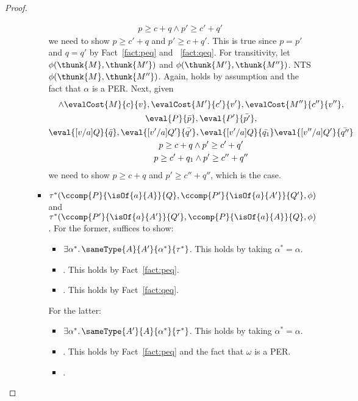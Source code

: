 \begin{proof}
\begin{enumerate}
\begin{itemize}
\begin{itemize}
\begin{gather*}
          p \ge c + q \land p' \ge c' + q'
        \end{gather*}
        we need to show 
        $p \ge c'  + q$ and $p' \ge c + q'$. This is true since $p = p'$ and $q = q'$ 
        by Fact~\ref{fact:peq} and ~\ref{fact:qeq}.
        For transitivity, let $\phi(\thunk{M}, \thunk{M'})$ and 
        $\phi(\thunk{M'}, \thunk{M''})$. NTS $\phi(\thunk{M}, \thunk{M''})$. Again,
         holds by assumption and the fact that $\alpha$ is 
        a PER. Next, given 
        \begin{gather*}
          \land \evalCost{M}{c}{v}, \evalCost{M'}{c'}{v'}, \evalCost{M''}{c''}{v''},\\
          \eval{P}{\bar{p}}, \eval{P'}{\bar{p'}},\\ 
          \eval{[v/a]Q}{\bar{q}}, \eval{[v'/a]Q'}{\bar{q'}}, 
            \eval{[v'/a]Q}{\bar{q_1}} \eval{[v''/a]Q'}{\bar{q''}}\\
          p \ge c + q \land p' \ge c' + q'\\
          p \ge c' + q_1 \land p' \ge c'' + q''
        \end{gather*}
        we need to show $p \ge c  + q$ and $p' \ge c'' + q''$, which is the case.
      \item $\tau^*(\ccomp{P}{\isOf{a}{A}}{Q}, \ccomp{P'}{\isOf{a}{A'}}{Q'}, \phi)$ and
        $\tau^*(\ccomp{P'}{\isOf{a}{A'}}{Q'}, \ccomp{P}{\isOf{a}{A}}{Q}, \phi)$.
        For the former, suffices to show:
        \begin{itemize}
           \item $\exists \alpha^*.\, \sameType{A}{A'}{\alpha^*}{\tau^*}$. This holds by 
             taking $\alpha^* = \alpha$. 
           \item {}. This holds by Fact~\ref{fact:peq}.
           \item {}. This holds by 
             Fact~\ref{fact:qeq}.
        \end{itemize}
        For the latter:
        \begin{itemize}
           \item $\exists \alpha^*.\, \sameType{A'}{A}{\alpha^*}{\tau^*}$. This holds by 
             taking $\alpha^* = \alpha$. 
           \item {}. This holds by Fact~\ref{fact:peq} and 
             the fact that $\omega$ is a PER.
           \item {}. 

\end{itemize}
\end{itemize}
\end{itemize}
\end{enumerate}
\end{proof}
